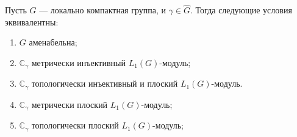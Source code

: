 \begin{proposition}\label{OneDimL1ModMetTopInjFlatCharac} Пусть $G$ --- локально
компактная группа, и $\gamma\in\widehat{G}$. Тогда следующие условия
эквивалентны: 

\begin{enumerate}[label = (\roman*)]
    \item $G$ аменабельна;

    \item $\mathbb{C}_\gamma$ метрически инъективный $L_1(G)$-модуль;

    \item $\mathbb{C}_\gamma$ топологически инъективный 
    и плоский $L_1(G)$-модуль.

    \item $\mathbb{C}_\gamma$ метрически плоский $L_1(G)$-модуль;

    \item $\mathbb{C}_\gamma$ топологически плоский $L_1(G)$-модуль;
\end{enumerate}

\end{proposition}
